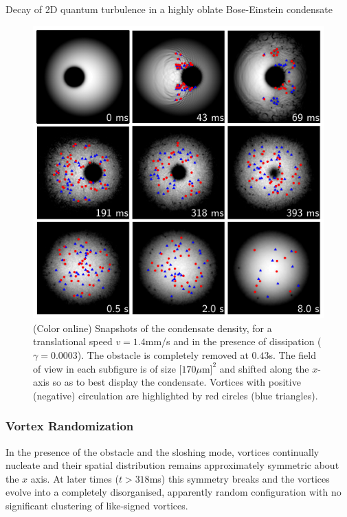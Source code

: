 \begin{chapter}{\label{cha:shin}Decay of 2D quantum turbulence in a highly oblate Bose-Einstein condensate}
\begin{figure}
\centering
\includegraphics[width=0.7\linewidth]{shin/fig2}
\caption{\label{fig:densSnapshots} (Color online) Snapshots of the condensate density, for a translational speed $v=1.4$mm/s and in the presence of dissipation ($\gamma=0.0003$). The obstacle is completely removed at $0.43$s. The field of view in each subfigure is of size $[170\mu$m$]^2$ and shifted along the $x$-axis so as to best display the condensate.  Vortices with positive (negative) circulation are highlighted by red circles (blue triangles).
}
\end{figure}

\subsubsection{Vortex Randomization}
In the presence of the obstacle and the sloshing mode,
vortices continually nucleate and their spatial distribution remains
approximately symmetric about the $x$ axis.  
At later times ($t>318$ms) this symmetry breaks and the vortices 
evolve into a completely disorganised, apparently random 
configuration with no significant clustering of like-signed vortices.  


\end{chapter}
